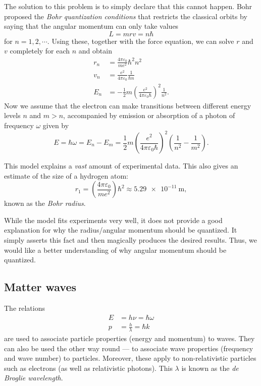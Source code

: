 \documentclass[a4paper]{article}
\begin{document}
The solution to this problem is to simply declare that this cannot happen. Bohr proposed the \emph{Bohr quantization conditions} that restricts the classical orbits by saying that the angular momentum can only take values
\[
  L = mrv = n\hbar
\]
for $n = 1, 2, \cdots$. Using these, together with the force equation, we can solve $r$ and $v$ completely for each $n$ and obtain
\begin{align*}
  r_n &= \frac{4\pi \varepsilon_0}{me^2}\hbar^2 n^2\\
  v_n &= \frac{e^2}{4\pi \varepsilon_0}\frac{1}{\hbar n}\\
  E_n &= -\frac{1}{2}m\left(\frac{e^2}{4\pi \varepsilon_0 \hbar}\right)^2 \frac{1}{n^2}.
\end{align*}
Now we assume that the electron can make transitions between different energy levels $n$ and $m > n$, accompanied by emission or absorption of a photon of frequency $\omega$ given by
\[
  E = \hbar \omega = E_n - E_m = \frac{1}{2}m \left(\frac{e^2}{4\pi \varepsilon_0 \hbar}\right)^2\left(\frac{1}{n^2} - \frac{1}{m^2}\right).
\]
\begin{center}
\end{center}
This model explains a \emph{vast} amount of experimental data. This also gives an estimate of the size of a hydrogen atom:
\[
  r_1 = \left(\frac{4\pi \varepsilon_0}{me^2}\right) \hbar^2 \approx \SI{5.29e-11}{\meter},
\]
known as the \emph{Bohr radius}.

While the model fits experiments very well, it does not provide a good explanation for why the radius/angular momentum should be quantized. It simply asserts this fact and then magically produces the desired results. Thus, we would like a better understanding of why angular momentum should be quantized.

\subsection{Matter waves}
The relations
\begin{align*}
  E &= h\nu = \hbar \omega\\
  p &= \frac{h}{\lambda} = \hbar k
\end{align*}
are used to associate particle properties (energy and momentum) to waves. They can also be used the other way round --- to associate wave properties (frequency and wave number) to particles. Moreover, these apply to non-relativistic particles such as electrons (as well as relativistic photons). This $\lambda$ is known as the \emph{de Broglie wavelength}.
\end{document}
